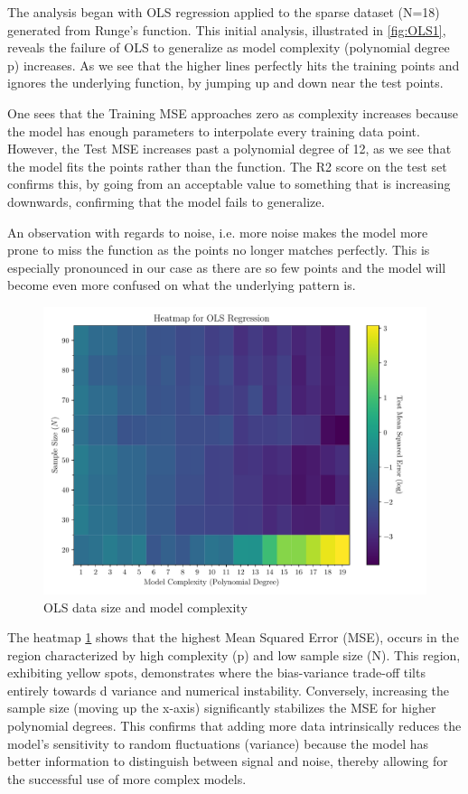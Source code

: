 \documentclass[twocolumn,aps]{revtex4}
\begin{document}
The analysis began with OLS regression applied to the sparse dataset (N=18) generated from Runge’s function. 
This initial analysis, illustrated in \ref{fig:OLS1}, reveals the failure of OLS to generalize as model complexity (polynomial degree p) increases. 
As we see that the higher lines perfectly hits the training points and ignores the underlying function, by jumping up and down near the test points.

One sees that the Training MSE approaches zero as complexity increases because the model has enough parameters to interpolate every training data point. 
However, the Test MSE increases past a polynomial degree of 12, as we see that the model fits the points rather than the function.
The R2 score on the test set confirms this, by going from an acceptable value to something that is increasing downwards, confirming that the model fails to generalize.

An observation with regards to noise, i.e. more noise makes the model more prone to miss the function as the points no longer matches perfectly. This is especially pronounced in our case as there are so few points and the model will become even more confused on what the underlying pattern is.
\begin{figure}[H]
    \centering
    \includegraphics[width=.95 \linewidth]{Figures/OLS_Heatmap.pdf}
    \caption{OLS data size and model complexity}
    \label{fig:OLSHeat}
\end{figure}


The heatmap \ref{fig:OLSHeat} shows that the highest Mean Squared Error (MSE), occurs in the region characterized by high complexity (p) and low sample size (N). 
This region, exhibiting yellow spots, demonstrates where the bias-variance trade-off tilts entirely towards d variance and numerical instability. 
Conversely, increasing the sample size (moving up the x-axis) significantly stabilizes the MSE for higher polynomial degrees. 
This confirms that adding more data intrinsically reduces the model's sensitivity to random fluctuations (variance) because the model has better information to distinguish between signal and noise, thereby allowing for the successful use of more complex models.
\end{document}
